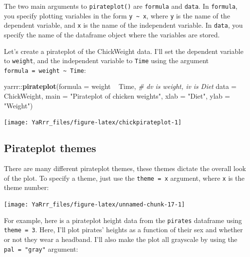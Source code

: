 \documentclass[]{book}
\newenvironment{Shaded}{\begin{snugshade}}{\end{snugshade}}
\newcommand{\KeywordTok}[1]{\textcolor[rgb]{0.13,0.29,0.53}{\textbf{{#1}}}}
\newcommand{\DataTypeTok}[1]{\textcolor[rgb]{0.13,0.29,0.53}{{#1}}}
\newcommand{\StringTok}[1]{\textcolor[rgb]{0.31,0.60,0.02}{{#1}}}
\newcommand{\CommentTok}[1]{\textcolor[rgb]{0.56,0.35,0.01}{\textit{{#1}}}}
\newcommand{\NormalTok}[1]{{#1}}
\theoremstyle{definition}
\theoremstyle{definition}
\theoremstyle{remark}
\begin{document}
The two main arguments to \texttt{pirateplot()} are \texttt{formula} and
\texttt{data}. In \texttt{formula}, you specify plotting variables in
the form \texttt{y\ \textasciitilde{}\ x}, where \texttt{y} is the name
of the dependent variable, and \texttt{x} is the name of the independent
variable. In \texttt{data}, you specify the name of the dataframe object
where the variables are stored.

Let's create a pirateplot of the ChickWeight data. I'll set the
dependent variable to \texttt{weight}, and the independent variable to
\texttt{Time} using the argument
\texttt{formula\ =\ weight\ \textasciitilde{}\ Time}:

\begin{Shaded}
\begin{Highlighting}[]
\NormalTok{yarrr::}\KeywordTok{pirateplot}\NormalTok{(}\DataTypeTok{formula =} \NormalTok{weight ~}\StringTok{ }\NormalTok{Time, }\CommentTok{# dv is weight, iv is Diet}
                   \DataTypeTok{data =} \NormalTok{ChickWeight,}
                   \DataTypeTok{main =} \StringTok{"Pirateplot of chicken weights"}\NormalTok{,}
                   \DataTypeTok{xlab =} \StringTok{"Diet"}\NormalTok{,}
                   \DataTypeTok{ylab =} \StringTok{"Weight"}\NormalTok{)}
\end{Highlighting}
\end{Shaded}

\begin{center}\texttt{[image: YaRrr\_files/figure-latex/chickpirateplot-1]} \end{center}

\subsection{Pirateplot themes}\label{pirateplot-themes}

There are many different pirateplot themes, these themes dictate the
overall look of the plot. To specify a theme, just use the
\texttt{theme\ =\ x} argument, where \texttt{x} is the theme number:

\begin{center}\texttt{[image: YaRrr\_files/figure-latex/unnamed-chunk-17-1]} \end{center}

For example, here is a pirateplot height data from the \texttt{pirates}
dataframe using \texttt{theme\ =\ 3}. Here, I'll plot pirates' heights
as a function of their sex and whether or not they wear a headband. I'll
also make the plot all grayscale by using the \texttt{pal\ =\ "gray"}
argument:
\end{document}
